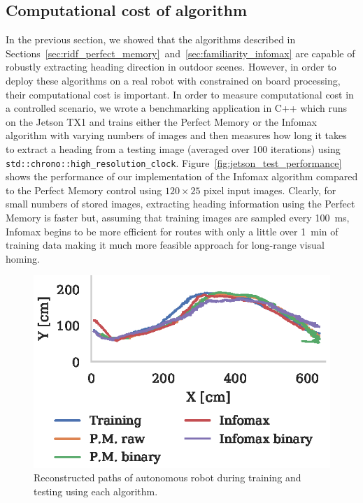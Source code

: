 \documentclass[letterpaper]{article}
\begin{document}
\subsection{Computational cost of algorithm}
In the previous section, we showed that the algorithms described in Sections~\ref{sec:ridf_perfect_memory}~and~\ref{sec:familiarity_infomax} are capable of robustly extracting heading direction in outdoor scenes. 
However, in order to deploy these algorithms on a real robot with constrained on board processing, their computational cost is important. 
In order to measure computational cost in a controlled scenario, we wrote a benchmarking application in C++ which runs on the Jetson TX1 and trains either the Perfect Memory or the Infomax algorithm with varying numbers of images and then measures how long it takes to extract a heading from a testing image (averaged over \num{100} iterations) using \lstinline{std::chrono::high_resolution_clock}.
Figure~\ref{fig:jetson_test_performance} shows the performance of our implementation of the Infomax algorithm compared to the Perfect Memory control using $120 \times 25$ pixel input images.
Clearly, for small numbers of stored images, extracting heading information using the Perfect Memory is faster but, assuming that training images are sampled every \SI{100}{\milli\second}, Infomax begins to be more efficient for routes with only a little over \SI{1}{\minute} of training data making it much more feasible approach for long-range visual homing.

\begin{figure}[t]
    \centering
    \includegraphics{figures/robot_paths.eps}
    \caption{Reconstructed paths of autonomous robot during training and testing using each algorithm.}
    \label{fig:robot_paths}
\end{figure}
\end{document}
